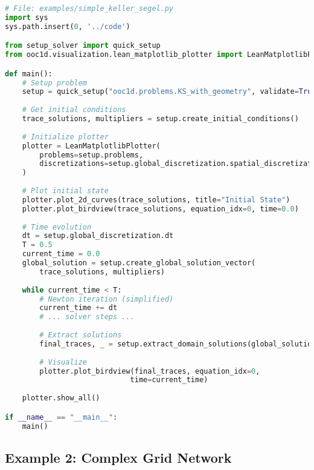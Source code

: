 \documentclass[11pt,a4paper]{article}
\begin{document}
\begin{lstlisting}[language=Python, caption={Simple Keller-Segel Example}]
# File: examples/simple_keller_segel.py
import sys
sys.path.insert(0, '../code')

from setup_solver import quick_setup
from ooc1d.visualization.lean_matplotlib_plotter import LeanMatplotlibPlotter

def main():
    # Setup problem
    setup = quick_setup("ooc1d.problems.KS_with_geometry", validate=True)
    
    # Get initial conditions
    trace_solutions, multipliers = setup.create_initial_conditions()
    
    # Initialize plotter
    plotter = LeanMatplotlibPlotter(
        problems=setup.problems,
        discretizations=setup.global_discretization.spatial_discretizations
    )
    
    # Plot initial state
    plotter.plot_2d_curves(trace_solutions, title="Initial State")
    plotter.plot_birdview(trace_solutions, equation_idx=0, time=0.0)
    
    # Time evolution
    dt = setup.global_discretization.dt
    T = 0.5
    current_time = 0.0
    global_solution = setup.create_global_solution_vector(
        trace_solutions, multipliers)
    
    while current_time < T:
        # Newton iteration (simplified)
        current_time += dt
        # ... solver steps ...
        
        # Extract solutions
        final_traces, _ = setup.extract_domain_solutions(global_solution)
        
        # Visualize
        plotter.plot_birdview(final_traces, equation_idx=0, 
                             time=current_time)
    
    plotter.show_all()

if __name__ == "__main__":
    main()
\end{lstlisting}

\subsection{Example 2: Complex Grid Network}
\end{document}
